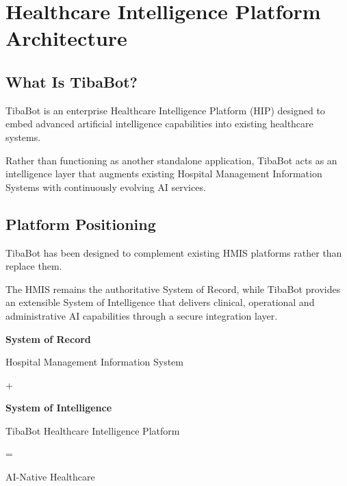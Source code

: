 
\chapter*{Healthcare Intelligence Platform Architecture}


\section{What Is TibaBot?}

TibaBot is an enterprise Healthcare Intelligence Platform (HIP) designed to embed advanced artificial intelligence capabilities into existing healthcare systems.

Rather than functioning as another standalone application, TibaBot acts as an intelligence layer that augments existing Hospital Management Information Systems with continuously evolving AI services.


\section{Platform Positioning}

TibaBot has been designed to complement existing HMIS platforms rather than replace them.

The HMIS remains the authoritative System of Record, while TibaBot provides an extensible System of Intelligence that delivers clinical, operational and administrative AI capabilities through a secure integration layer.

\vspace{6mm}

\begin{callout}

\centering

\Large

\textbf{System of Record}

Hospital Management Information System

\vspace{5mm}

+

\vspace{5mm}

\Large

\textbf{System of Intelligence}

TibaBot Healthcare Intelligence Platform

\vspace{5mm}

=

\vspace{5mm}

\Huge

AI-Native Healthcare

\end{callout}


